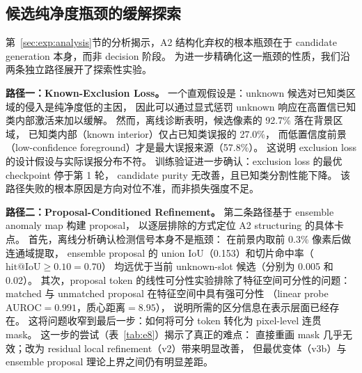 \documentclass[3p,twocolumn,authoryear]{elsarticle}
\begin{document}
\subsection{候选纯净度瓶颈的缓解探索}\label{sec:exp:explore}

第~\ref{sec:exp:analysis}节的分析揭示，A2 结构化弃权的根本瓶颈在于 candidate generation 本身，而非 decision 阶段。
为进一步精确化这一瓶颈的性质，我们沿两条独立路径展开了探索性实验。

\textbf{路径一：Known-Exclusion Loss。}
一个直观假设是：unknown 候选对已知类区域的侵入是纯净度低的主因，
因此可以通过显式惩罚 unknown 响应在高置信已知类内部激活来加以缓解。
然而，离线诊断表明，候选像素的 92.7\% 落在背景区域，
已知类内部（known interior）仅占已知类误报的 27.0\%，
而低置信度前景（low-confidence foreground）才是最大误报来源（57.8\%）。
这说明 exclusion loss 的设计假设与实际误报分布不符。
训练验证进一步确认：exclusion loss 的最优 checkpoint 停于第 1 轮，
candidate purity 无改善，且已知类分割性能下降。
该路径失败的根本原因是方向对位不准，而非损失强度不足。

\textbf{路径二：Proposal-Conditioned Refinement。}
第二条路径基于 ensemble anomaly map 构建 proposal，
以逐层排除的方式定位 A2 structuring 的具体卡点。
首先，离线分析确认检测信号本身不是瓶颈：
在前景内取前 0.3\% 像素后做连通域提取，
ensemble proposal 的 union IoU（0.153）和切片命中率（$\text{hit@IoU}{\geq}0.10=0.70$）
均远优于当前 unknown-slot 候选（分别为 0.005 和 0.02）。
其次，proposal token 的线性可分性实验排除了特征空间可分性的问题：
matched 与 unmatched proposal 在特征空间中具有强可分性
（linear probe AUROC$=0.991$，质心距离$=8.95$），
说明所需的区分信息在表示层面已经存在。
这将问题收窄到最后一步：如何将可分 token 转化为 pixel-level 连贯 mask。
这一步的尝试（表~\ref{tab:e8}）揭示了真正的难点：
直接重画 mask 几乎无效；改为 residual local refinement（v2）带来明显改善，
但最优变体（v3b）与 ensemble proposal 理论上界之间仍有明显差距。

\begin{table}[h]
\centering
\caption{Proposal-conditioned refinement 各变体与 ensemble proposal 上界对比（A2，Synapse）。}
\label{tab:e8}
%
\end{table}
\end{document}
